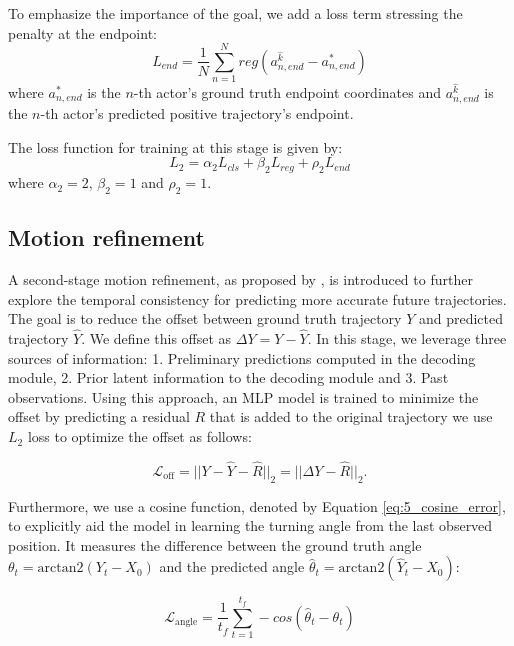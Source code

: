 To emphasize the importance of the goal, we add a loss term stressing the penalty at the endpoint:
\begin{equation}
	L_{end}=\frac{1}{N}\sum_{n=1}^N{reg(a_{n,end}^{\hat{k}}-a^{*}_{n,end})}
\end{equation}
where $a^{*}_{n,end}$ is the $n$-th actor's ground truth endpoint coordinates and $a_{n,end}^{\hat{k}}$ is the $n$-th actor's predicted positive trajectory's endpoint.

The loss function for training at this stage is given by:
\begin{equation}
	L_{2} = \alpha_2 L_{cls} + \beta_2 L_{reg} + \rho_2 L_{end}
\end{equation}
where $\alpha_2=2$, $\beta_2=1$ and $\rho_2=1$.

\subsection{Motion refinement}
\label{subsec:refinement}

A second-stage motion refinement, as proposed by \cite{liu2023laformer}, is introduced to further explore the temporal consistency for predicting more accurate future trajectories. The goal is to reduce the offset between ground truth trajectory $Y$ and predicted trajectory $\hat{Y}$. We define this offset as $\Delta{Y} = Y - \hat{Y}$. In this stage, we leverage three sources of information: 1. Preliminary predictions computed in the decoding module, 2. Prior latent information to the decoding module and 3. Past observations. Using this approach, an MLP model is trained to minimize the offset by predicting a residual $R$ that is added to the original trajectory \ie we use $L_2$ loss to optimize the offset as follows:

\begin{equation}
	\label{eq:5_pose_error}
	\mathcal{L}_\text{off}= ||{Y} - \hat{Y} - \hat{R}||_2 = ||\Delta{Y} - \hat{R}||_2.
\end{equation}

Furthermore, we use a cosine function, denoted by Equation \ref{eq:5_cosine_error}, to explicitly aid the model in learning the turning angle from the last observed position. It measures the difference between the ground truth angle $\theta_{t}= \text{arctan2}(Y_{t}-{X}_{0})$ and the predicted angle $\hat{\theta}_{t}= \text{arctan2}(\hat{Y}_{t}-{X}_{0})$:

\begin{equation}
	\mathcal{L}_{\text{angle}}=\frac{1}{t_{f}}\sum^{t_{f}}_{t=1}-cos(\hat{\theta}_{t}-\theta_{t})
	\label{eq:poseerror}
\end{equation}


